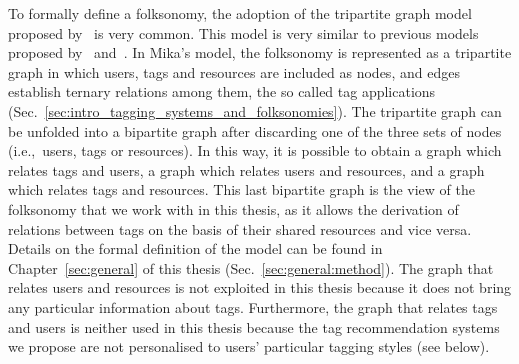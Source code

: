 To formally define a folksonomy, the adoption of the tripartite graph model proposed by~\cite{Mika2007a} is very common. This model is very similar to previous models proposed by~\cite{hoto2006} and~\cite{jaske2007}.
In Mika's model, the folksonomy is represented as a tripartite graph in which users, tags and resources are included as nodes, and edges establish ternary relations among them, the so called tag applications (Sec.~\ref{sec:intro_tagging_systems_and_folksonomies}).
The tripartite graph can be unfolded into a bipartite graph after discarding one of the three sets of nodes (i.e.,~users, tags or resources). In this way, it is possible to obtain a graph which relates tags and users, a graph which relates users and resources, and a graph which relates tags and resources. This last bipartite graph is the view of the folksonomy that we work with in this thesis, as it allows the derivation of relations between tags on the basis of their shared resources and vice versa.
Details on the formal definition of the model can be found in Chapter~\ref{sec:general} of this thesis (Sec.~\ref{sec:general:method}).
The graph that relates users and resources is not exploited in this thesis because it does not bring any particular information about tags. Furthermore, the graph that relates tags and users is neither used in this thesis because the tag recommendation systems we propose are not personalised to users' particular tagging styles (see below).

